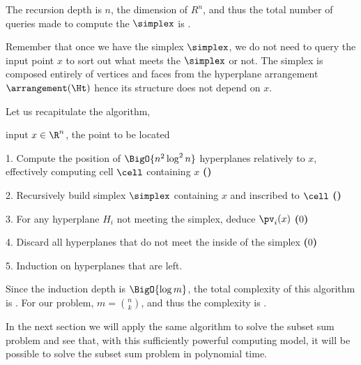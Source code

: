 The recursion depth is $n$, the dimension of $R^n$, and thus the total number
of queries made to compute the $\simplex$ is .

Remember that once we have the simplex $\simplex$, we do not need to query the input point
$x$ to sort out what meets the $\simplex$ or not. The simplex is composed
entirely of vertices and faces from the hyperplane arrangement $\arrangement(\Ht)$ hence
its structure does not depend on $x$.

Let us recapitulate the algorithm,

\begin{algorithm}
\item[input] $x \in \R^n$, the point to be located
\item[1.] Compute the position of $\BigO{n^2 \log^2 n}$ hyperplanes relatively to
$x$, effectively computing cell $\cell$ containing $x$ \textbf{()}
\item[2.] Recursively build simplex $\simplex$ containing $x$ and inscribed to $\cell$
\textbf{()}
\item[3.] For any hyperplane $H_i$ not meeting the simplex, deduce $\pv_i(x)$
\textbf{($0$)}
\item[4.] Discard all hyperplanes that do not meet the inside of the
simplex \textbf{($0$)}
\item[5.] Induction on hyperplanes that are left.
\end{algorithm}

Since the induction depth is $\BigO{\log m}$, the total complexity of this algorithm
is . For our \kSUM problem, $m = \binom{n}{k}$,
and thus the complexity is .

In the next section we will apply the same algorithm to solve the
subset sum problem and see that, with this sufficiently powerful computing
model, it will be possible to solve the subset sum problem in polynomial time.

